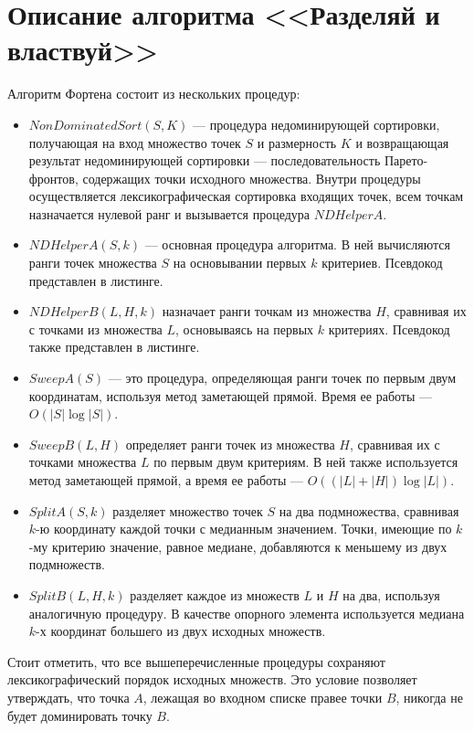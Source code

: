 \section{Описание алгоритма <<Разделяй и властвуй>>}
Алгоритм Фортена состоит из нескольких процедур:
\begin{itemize}
    \item $NonDominatedSort(S, K)$ --- процедура недоминирующей сортировки, получающая на вход множество точек $S$ и размерность $K$ и возвращающая результат недоминирующей сортировки --- последовательность Парето-фронтов, содержащих точки исходного множества.
Внутри процедуры осуществляется лексикографическая сортировка входящих точек, всем точкам назначается нулевой ранг и вызывается процедура $NDHelperA$.
    \item $NDHelperA(S, k)$ --- основная процедура алгоритма. В ней вычисляются ранги точек множества $S$ на основывании первых $k$ критериев. Псевдокод представлен в листинге.
    \item $NDHelperB(L, H, k)$ назначает ранги точкам из множества $H$, сравнивая их с точками из множества $L$, основываясь на первых $k$ критериях. Псевдокод также представлен в листинге.
    \item $SweepA(S)$ --- это процедура, определяющая ранги точек по первым двум координатам, используя метод заметающей прямой. Время ее работы --- $O(|S|\log|S|)$.
    \item $SweepB(L, H)$ определяет ранги точек из множества $H$, сравнивая их с точками множества $L$ по первым двум критериям. В ней также используется метод заметающей прямой, а время ее работы --- $O((|L| + |H|)\log{|L|})$.
    \item $SplitA(S, k)$ разделяет множество точек $S$ на два подмножества, сравнивая $k$-ю координату каждой точки с медианным значением. Точки, имеющие по $k$-му критерию значение, равное медиане, добавляются к меньшему из двух подмножеств.
    \item $SplitB(L, H, k)$ разделяет каждое из множеств $L$ и $H$ на два, используя аналогичную процедуру. В качестве опорного элемента используется медиана $k$-х координат большего из двух исходных множеств.
\end{itemize}

Стоит отметить, что все вышеперечисленные процедуры сохраняют лексикографический порядок исходных множеств.
Это условие позволяет утверждать, что точка $A$, лежащая во входном списке правее точки $B$, никогда не будет доминировать точку $B$.

